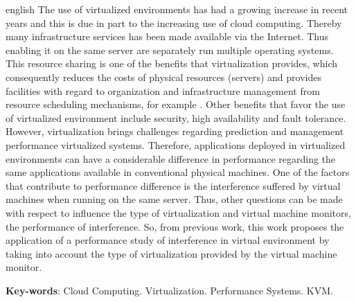 \begin{resumo}[Abstract]
 \begin{otherlanguage*}{english}
The use of virtualized environments has had a growing increase in recent years and this is due in part to the increasing use of cloud computing. Thereby many infrastructure services has been made available via the Internet. Thus enabling it on the same server are separately run multiple operating systems. This resource sharing is one of the benefits that virtualization provides, which consequently reduces the costs of physical resources (servers) and provides facilities with regard to organization and infrastructure management from resource scheduling mechanisms, for example . Other benefits that favor the use of virtualized environment include security, high availability and fault tolerance. However, virtualization brings challenges regarding prediction and management performance virtualized systems. Therefore, applications deployed in virtualized environments can have a considerable difference in performance regarding the same applications available in conventional physical machines. One of the factors that contribute to performance difference is the interference suffered by virtual machines when running on the same server. Thus, other questions can be made with respect to influence the type of virtualization and virtual machine monitors, the performance of interference. So, from previous work, this work proposes the application of a performance study of interference in virtual environment by taking into account the type of virtualization provided by the virtual machine monitor.






   \vspace{\onelineskip}
 
   \noindent 
   \textbf{Key-words}: Cloud Computing. Virtualization. Performance Systems. KVM.
 \end{otherlanguage*}
\end{resumo}

